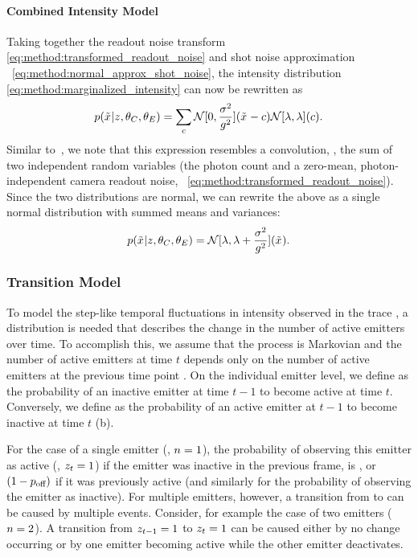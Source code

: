 \paragraph{Combined Intensity Model}

Taking together the readout noise transform
\eqref{eq:method:transformed_readout_noise} and shot noise approximation ~\eqref{eq:method:normal_approx_shot_noise}, the
intensity distribution \eqref{eq:method:marginalized_intensity} can now be
rewritten as
%
  \begin{equation}
    p(\tilde{x}_{}|z_{},\theta_C, \theta_E)
      = \sum_c
        \mathcal{N}[0, \frac{\sigma^2}{g^2}](\tilde{x}_{} - c)
        \mathcal{N}[\lambda, \lambda](c)
    \text{.}
  \end{equation}
  Similar to~\cite{huang_video-rate_2013}, we note that this expression
  resembles a convolution, \ie, the sum of two independent random variables
  (the photon count \photons and a zero-mean, photon-independent camera readout
  noise, ~\eqref{eq:method:transformed_readout_noise}). Since the two distributions are normal, we can rewrite
  the above as a single normal distribution with summed means and variances:
  \begin{equation}
    p(\tilde{x}_{}|z_{},\theta_C, \theta_E)
      = \mathcal{N}[\lambda, \lambda + \frac{\sigma^2}{g^2}](\tilde{x}_{})
    \text{.}
    \label{eq:method:combined_intensity}
  \end{equation}

\subsubsection{Transition Model}

To model the step-like temporal fluctuations in intensity observed in
the trace \trace, a distribution is needed that describes the change in the
number of active emitters \z{} over time.
  To accomplish this, we assume that the process is Markovian and the number of active
  emitters  at time $t$ depends only on the number of active emitters at
  the previous time point .
  On the individual emitter level, we define \pon as the probability of an
  inactive emitter at time $t-1$ to become active at time $t$.
  Conversely, we define \poff as the probability of an active emitter at $t-1$
  to become inactive at time $t$ (b).

For the case of a single emitter (\ie, $n=1$), the probability of observing
this emitter as active (\ie, $z_{t}=1$) if the emitter was
inactive in the previous frame, is \pon , or $(1-p_\text{off})$ if 
it was previously active (and similarly for the probability of observing 
the emitter as inactive).
  For multiple emitters, however, a transition from  to  can be
  caused by multiple events. Consider, for example the case of two emitters
  ($n=2$). A transition from $z_{t-1}=1$ to $z_{t}=1$ can be caused either by
  no change occurring or by one emitter becoming active while the other emitter 
  deactivates.

